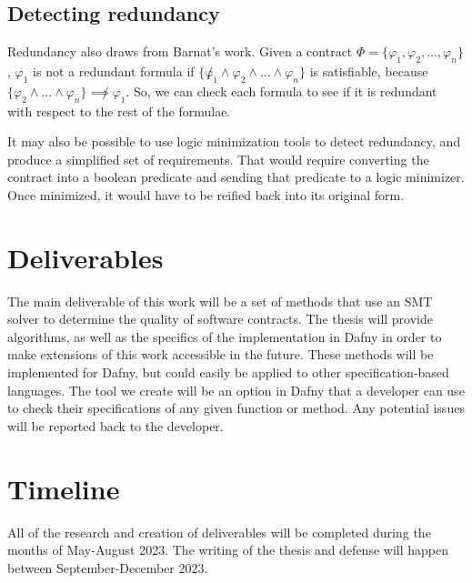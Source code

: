 \documentclass{article}
\begin{document}
\subsection*{Detecting redundancy}

Redundancy also draws from Barnat's work. Given a contract \(\Phi = \{\varphi_{1}, \varphi_{2}, ..., \varphi_{n}\}\),
\(\varphi_{1}\) is not a redundant formula if \(\{\not \varphi_{1} \land \varphi_{2} \land ... \land \varphi_{n}\}\)
is satisfiable, because \(\{\varphi_{2} \land ... \land \varphi_{n}\} \not\implies \varphi_{1}\). So, we can check
each formula to see if it is redundant with respect to the rest of the formulae. 

It may also be possible to use logic minimization tools to detect redundancy, and produce a simplified set of requirements. That would require 
converting the contract into a boolean predicate and sending that predicate to a logic minimizer. Once minimized, it would have to be reified back 
into its original form. 

\section{Deliverables}

The main deliverable of this work will be a set of methods that use an SMT solver to determine the quality of software
contracts. The thesis will provide algorithms, as well as the specifics of the implementation in Dafny in order to make
extensions of this work accessible in the future. These methods will be implemented for Dafny, but could easily be
applied to other specification-based languages. The tool we create will be an option in Dafny that a developer can
use to check their specifications of any given function or method. Any potential issues will be reported back to the
developer.

\section{Timeline}

All of the research and creation of deliverables will be completed during the months of May-August 2023. The writing of the thesis and defense will happen between September-December 2023.

% 
% 
% 

\end{document}
